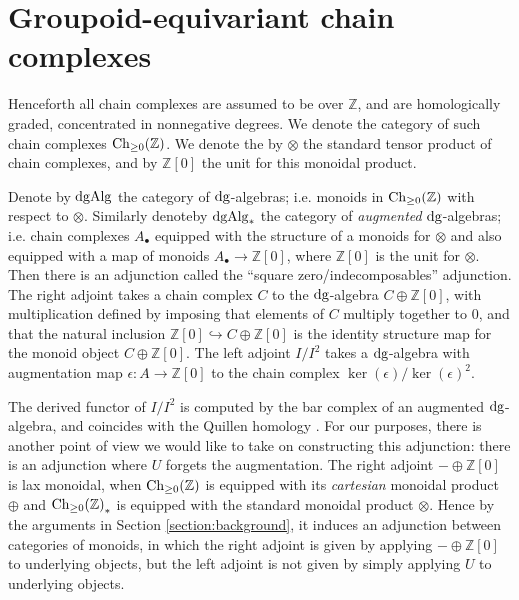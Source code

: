 \documentclass[12pt]{amsart}
\begin{document}
\section{Groupoid-equivariant chain complexes}
\label{section:chgpd}
Henceforth all chain complexes are assumed to be over $\mathbb{Z}$, and are homologically graded, concentrated in nonnegative degrees. 
We denote the category of such chain complexes $\mathrm{Ch}_{\ge 0}(\mathbb{Z})$. 
We denote the by $\otimes$ the standard tensor product of chain complexes, and by $\mathbb{Z}[0]$ the unit for this monoidal product.
\par 
Denote by $\mathrm{dgAlg}$ the category of $\mathrm{dg}$-algebras; i.e. monoids in $\mathrm{Ch}_{\ge 0}(\mathbb{Z})$ with respect to $\otimes$. Similarly denoteby $\mathrm{dgAlg}_*$ the category of \textit{augmented} $\mathrm{dg}$-algebras; i.e. chain complexes $A_\bullet$ equipped with the structure of a monoids for $\otimes$ and also equipped with a map of monoids $A_\bullet \to \mathbb{Z}[0]$, where $\mathbb{Z}[0]$ is the unit for $\otimes$. 
Then there is an adjunction
called the ``square zero/indecomposables'' adjunction. 
The right adjoint takes a chain complex $C$ to the $\mathrm{dg}$-algebra $C \oplus \mathbb{Z}[0]$, with multiplication defined by imposing that elements of $C$ multiply together to $0$, and that the natural inclusion $\mathbb{Z}[0] \hookrightarrow C \oplus \mathbb{Z}[0]$ is the identity structure map for the monoid object $C \oplus \mathbb{Z}[0]$. 
The left adjoint $I/I^2$ takes a $\mathrm{dg}$-algebra with augmentation map $\epsilon: A \to \mathbb{Z}[0]$ to the chain complex $\ker(\epsilon)/\ker(\epsilon)^2$. 
\par 
The derived functor of $I/I^2$ is computed by the bar complex of an augmented $\mathrm{dg}$-algebra, and coincides with the Quillen homology \cite{Harper2008}.
For our purposes, there is another point of view we would like to take on constructing this adjunction: there is an adjunction
where $U$ forgets the augmentation. The right adjoint $-\oplus \mathbb{Z}[0]$
is lax monoidal, when $\mathrm{Ch}_{\ge 0}(\mathbb{Z})$ is equipped with its \textit{cartesian} monoidal product $\oplus$ and ${\mathrm{Ch}_{\ge 0}(\mathbb{Z})}_*$ is equipped with the standard monoidal product $\otimes$. 
Hence by the arguments in Section \ref{section:background}, it induces an adjunction
between categories of monoids, in which the right adjoint is given by applying $-\oplus\mathbb{Z}[0]$ to underlying objects, but the left adjoint is not given by simply applying $U$ to underlying objects. 
\end{document}

